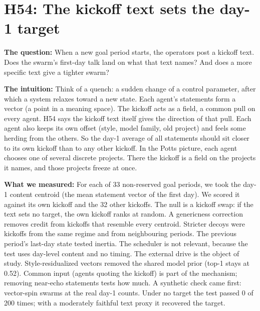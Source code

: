 \section{H54: The kickoff text sets the day-1 target}

\textbf{The question:} When a new goal period starts, the operators post a kickoff text. Does the swarm's first-day talk land on what that text names? And does a more specific text give a tighter swarm?

\textbf{The intuition:} Think of a quench: a sudden change of a control parameter, after which a system relaxes toward a new state. Each agent's statements form a vector (a point in a meaning space). The kickoff acts as a field, a common pull on every agent. H54 says the kickoff text itself gives the direction of that pull. Each agent also keeps its own offset (style, model family, old project) and feels some herding from the others. So the day-1 average of all statements should sit closer to its own kickoff than to any other kickoff. In the Potts picture, each agent chooses one of several discrete projects. There the kickoff is a field on the projects it names, and those projects freeze at once.

\textbf{What we measured:} For each of 33 non-reserved goal periods, we took the day-1 content centroid (the mean statement vector of the first day). We scored it against its own kickoff and the 32 other kickoffs. The null is a kickoff swap: if the text sets no target, the own kickoff ranks at random. A genericness correction removes credit from kickoffs that resemble every centroid. Stricter decoys were kickoffs from the same regime and from neighbouring periods. The previous period's last-day state tested inertia. The scheduler is not relevant, because the test uses day-level content and no timing. The external drive is the object of study. Style-residualized vectors removed the shared model prior (top-1 stays at 0.52). Common input (agents quoting the kickoff) is part of the mechanism; removing near-echo statements tests how much. A synthetic check came first: vector-spin swarms at the real day-1 counts. Under no target the test passed 0 of 200 times; with a moderately faithful text proxy it recovered the target.

